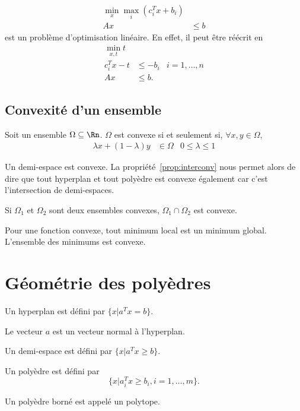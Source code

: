 \begin{myexem}
  \begin{align*}
    \min_{x} \max_i (c_i^Tx+b_i)\\
    Ax & \leq b
  \end{align*}
  est un problème d'optimisation linéaire.
  En effet, il peut être réécrit en
  \begin{align*}
    \min_{x,t} t\\
    c_i^Tx-t & \leq -b_i & i = 1, \ldots, n\\
    Ax & \leq b.
  \end{align*}
\end{myexem}

\subsection{Convexité d'un ensemble}
\begin{mydef}
  Soit un ensemble $\Omega \subseteq \Rn$.
  $\Omega$ est convexe si et seulement si, $\forall x, y \in \Omega$,
  \begin{align*}
    \lambda x + (1-\lambda) y & \in \Omega & 0 \leq \lambda \leq 1
  \end{align*}
\end{mydef}
\begin{myprop}
  Un demi-espace est convexe.
  La propriété~\ref{prop:interconv} nous permet alors de dire que
  tout hyperplan et tout polyèdre est convexe également car c'est
  l'intersection de demi-espaces.
\end{myprop}
\begin{myprop}
  \label{prop:interconv}
  Si $\Omega_1$ et $\Omega_2$ sont deux ensembles convexes,
  $\Omega_1 \cap \Omega_2$ est convexe.
\end{myprop}
\begin{myprop}
  Pour une fonction convexe, tout minimum local est un minimum global.
  L'ensemble des minimums est convexe.
\end{myprop}

\section{Géométrie des polyèdres}
\begin{mydef}[Hyperplan]
  Un hyperplan est défini par
  $\{ x|a^Tx=b \}$.
\end{mydef}
Le vecteur $a$ est un vecteur normal à l'hyperplan.
\begin{mydef}
  Un demi-espace est défini par
  $\{x|a^Tx\geq b\}$.
\end{mydef}
\begin{mydef}[Polyèdre]
  Un polyèdre est défini par
  \[ \{x|a_i^Tx \geq b_i, i = 1,\ldots,m\}. \]
\end{mydef}
Un polyèdre borné est appelé un polytope.

